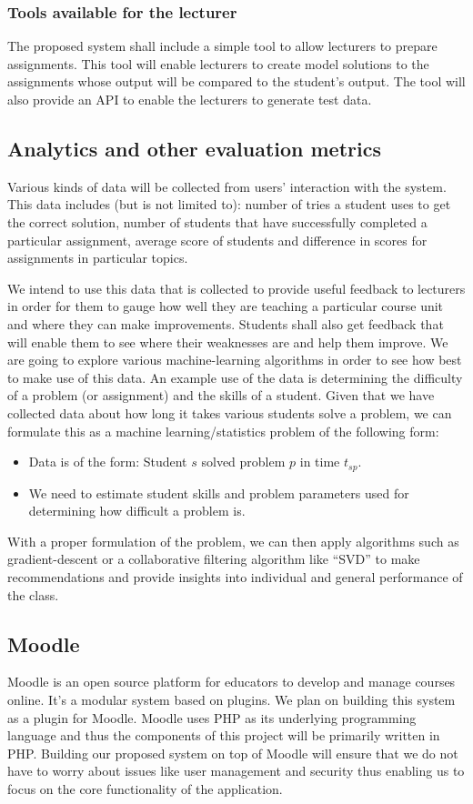 \documentclass[12pt]{article}
\begin{document}
		\subsubsection{Tools available for the lecturer}
		The proposed system shall include a simple tool to allow lecturers to prepare assignments. This tool will enable lecturers to create model solutions to the assignments whose output will be compared to the student’s output. The tool will also provide an API to enable the lecturers to generate test data.
	\subsection{Analytics and other evaluation metrics}
	Various kinds of data will be collected from users' interaction with the system. This data includes (but is not limited to): number of tries a student uses to get the correct solution, number of students that have successfully completed a particular assignment, average score of students and difference in scores for assignments in particular topics.
	
	We intend to use this data that is collected to provide useful feedback to lecturers in order for them to gauge how well they are teaching a particular course unit and where they can make improvements. Students shall also get feedback that will enable them to see where their weaknesses are and help	them improve. We are going to explore various machine-learning algorithms in order to see how best to make use of this data. An example use of the data is determining the difficulty of a problem (or assignment) and the skills of a student. Given that we have collected data about how long it takes various students solve a problem, we can formulate this as a machine learning/statistics problem of the following form:
	\begin{itemize}
		\item Data is of the form: Student $s$ solved problem $p$ in time $t_{sp}$.
		\item We need to estimate student skills and problem parameters used for determining how difficult a problem is. 
	\end{itemize}
	With a proper formulation of the problem, we can then apply algorithms such as gradient-descent \cite{gds} or a collaborative filtering algorithm like “SVD” \cite{kalman} to make recommendations and provide insights into individual and general performance of the class.
	\subsection{Moodle}
	Moodle\cite{moodle} is an open source platform for educators to develop and manage courses online. It's a modular system based on plugins. We plan on building this system as a plugin for Moodle. Moodle uses PHP as its underlying programming language and thus the components of this project will be primarily written in PHP. Building our proposed system on top of Moodle will ensure that we do not have to worry about issues like user management and security thus enabling us to focus on the core functionality of the application.
\end{document}
